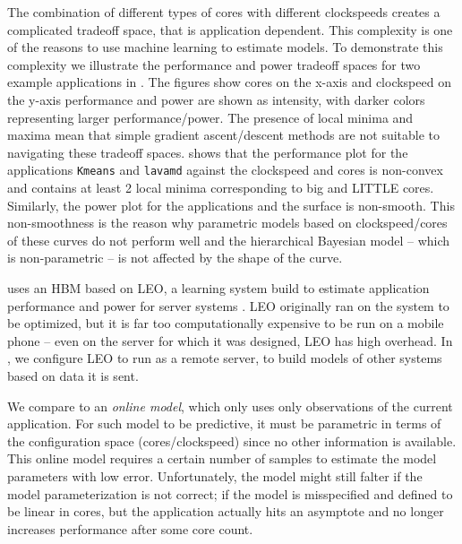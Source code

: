 The combination of different types of cores with different clockspeeds
creates a complicated tradeoff space, that is application dependent.
This complexity is one of the reasons to use machine learning to
estimate models.  To demonstrate this complexity we illustrate the
performance and power tradeoff spaces for two example applications in
.  The figures show cores on the x-axis and
clockspeed on the y-axis performance and power are shown as intensity,
with darker colors representing larger performance/power. The presence
of local minima and maxima mean that simple gradient ascent/descent
methods are not suitable to navigating these tradeoff spaces.
 shows that the performance plot for the
applications \texttt{Kmeans} and \texttt{lavamd} against the
clockspeed and cores is non-convex and contains at least 2 local
minima corresponding to big and LITTLE cores.  Similarly, the power
plot for the applications and the surface is non-smooth.  This
non-smoothness is the reason why parametric models based on
clockspeed/cores of these curves do not perform well and the
hierarchical Bayesian model -- which is non-parametric -- is not
affected by the shape of the curve. 




\SYSTEM{} uses an HBM based on LEO, a learning system build to
estimate application performance and power for server systems
\cite{LEO}.  LEO originally ran on the system to be optimized, but it
is far too computationally expensive to be run on a mobile phone --
even on the server for which it was designed, LEO has high overhead.
In \SYSTEM{}, we configure LEO to run as a remote server, to build
models of other systems based on data it is sent.

We compare \SYSTEM{} to an \emph{online model}, which only uses only
observations of the current application.  For such model to be
predictive, it must be parametric in terms of the configuration space
(cores/clockspeed) since no other information is available. This
online model requires a certain number of samples to estimate the
model parameters with low error.  Unfortunately, the model might still
falter if the model parameterization is not correct; \eg if the model
is misspecified and defined to be linear in cores, but the application
actually hits an asymptote and no longer increases performance after
some core count.

